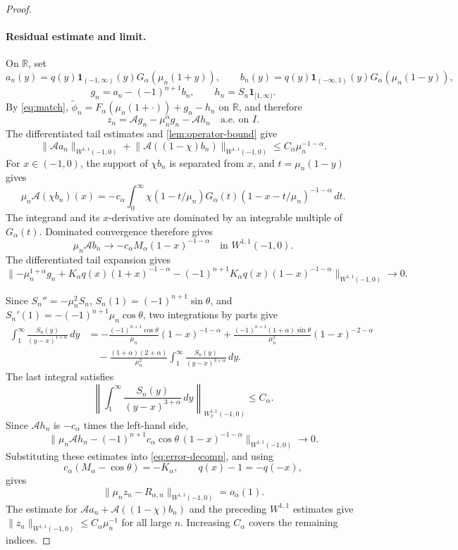 \documentclass[11pt]{amsart}
\numberwithin{equation}{section}
\theoremstyle{remark}
\newcommand{\R}{\mathbb R}
\newcommand{\one}{\mathbf 1}
\newcommand{\wt}{\widetilde}
\newcommand{\norm}[2][]{\lVert #2\rVert_{#1}}
\begin{document}
\begin{proof}
\paragraph{\textbf{Residual estimate and limit.}}
On $\R$, set
\[
 a_n(y)=q(y)\one_{(-1,\infty)}(y)G_\alpha(\mu_n(1+y)),
 \qquad
 b_n(y)=q(y)\one_{(-\infty,1)}(y)G_\alpha(\mu_n(1-y)),
\]
\[
 g_n=a_n-(-1)^{n+1} b_n,
 \qquad h_n=S_n\one_{[1,\infty)}.
\]
By \eqref{eq:match},
$\wt\phi_n=F_\alpha(\mu_n(1+\cdot))+g_n-h_n$ on $\R$, and therefore
\begin{equation}\label{eq:error-decomp}
 z_n=\mathcal A g_n-\mu_n^\alpha g_n-\mathcal A h_n
 \quad\text{a.e. on }I.
\end{equation}
The differentiated tail estimates and \cref{lem:operator-bound} give
\[
 \norm[W^{1,1}(-1,0)]{\mathcal Aa_n}
 +\norm[W^{1,1}(-1,0)]{\mathcal A((1-\chi)b_n)}
 \le C_\alpha\mu_n^{-1-\alpha}.
\]
For $x\in(-1,0)$, the support of $\chi b_n$ is separated from $x$, and
$t=\mu_n(1-y)$ gives
\[
 \mu_n\mathcal A(\chi b_n)(x)
 =-c_\alpha\int_0^\infty
 \chi(1-t/\mu_n)G_\alpha(t)(1-x-t/\mu_n)^{-1-\alpha}\,dt.
\]
The integrand and its $x$-derivative are dominated by an integrable multiple
of $G_\alpha(t)$.  Dominated convergence therefore gives
\[
 \mu_n\mathcal Ab_n\longrightarrow
 -c_\alpha M_\alpha(1-x)^{-1-\alpha}
 \quad\text{in }W^{1,1}(-1,0).
\]
The differentiated tail expansion gives
\[
 \norm[W^{1,1}(-1,0)]{
 -\mu_n^{1+\alpha}g_n
 +K_\alpha q(x)(1+x)^{-1-\alpha}
 -(-1)^{n+1}K_\alpha q(x)(1-x)^{-1-\alpha}}
 \longrightarrow0.
\]

Since $S_n''=-\mu_n^2S_n$, $S_n(1)=(-1)^{n+1}\sin\theta$, and
$S_n'(1)=-(-1)^{n+1}\mu_n\cos\theta$, two integrations by parts give
\begin{equation}\label{eq:Ah-two-parts}
\begin{aligned}
 \int_1^\infty\frac{S_n(y)}{(y-x)^{1+\alpha}}\,dy
 &=-\frac{(-1)^{n+1}\cos\theta}{\mu_n}(1-x)^{-1-\alpha}
 +\frac{(-1)^{n+1}(1+\alpha)\sin\theta}{\mu_n^2}(1-x)^{-2-\alpha}\\
 &\quad-\frac{(1+\alpha)(2+\alpha)}{\mu_n^2}
 \int_1^\infty\frac{S_n(y)}{(y-x)^{3+\alpha}}\,dy.
\end{aligned}
\end{equation}
The last integral satisfies
\[
 \left\|\int_1^\infty
 \frac{S_n(y)}{(y-x)^{3+\alpha}}\,dy\right\|_{W_x^{1,1}(-1,0)}
 \le C_\alpha.
\]
Since $\mathcal Ah_n$ is $-c_\alpha$ times the left-hand side,
\[
 \norm[W^{1,1}(-1,0)]{
 \mu_n\mathcal Ah_n
 -(-1)^{n+1}c_\alpha\cos\theta\,(1-x)^{-1-\alpha}}
 \longrightarrow0.
\]
Substituting these estimates into \eqref{eq:error-decomp}, and using
\[
 c_\alpha(M_\alpha-\cos\theta)=-K_\alpha,
 \qquad q(x)-1=-q(-x),
\]
gives
\[
 \norm[W^{1,1}(-1,0)]{\mu_nz_n-R_{\alpha,n}}
 =o_\alpha(1).
\]
The estimate for
$\mathcal Aa_n+\mathcal A((1-\chi)b_n)$ and the preceding $W^{1,1}$ estimates give
$\norm[W^{1,1}(-1,0)]{z_n}\le C_\alpha\mu_n^{-1}$ for all large $n$.
Increasing $C_\alpha$ covers the remaining indices.


\end{proof}
\end{document}
